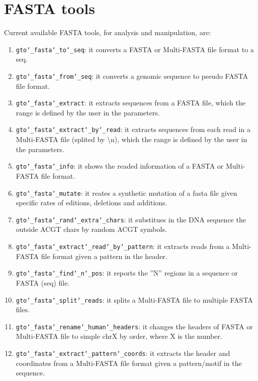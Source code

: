 \chapter{FASTA tools}
\label{fasta}

Current available FASTA tools, for analysis and manipulation, are:
\begin{enumerate}

\item \texttt{gto\char`_fasta\char`_to\char`_seq}: it converts a FASTA or Multi-FASTA file format to a seq.

\item \texttt{gto\char`_fasta\char`_from\char`_seq}: it converts a genomic sequence to pseudo FASTA file format.

\item \texttt{gto\char`_fasta\char`_extract}: it extracts sequences from a FASTA file, which the range is defined by the user in the parameters.

\item \texttt{gto\char`_fasta\char`_extract\char`_by\char`_read}: it extracts sequences from each read in a Multi-FASTA file (splited by \textbackslash n), which the range is defined by the user in the parameters.

\item \texttt{gto\char`_fasta\char`_info}: it shows the readed information of a FASTA or Multi-FASTA file format.

\item \texttt{gto\char`_fasta\char`_mutate}: it reates a synthetic mutation of a fasta file given specific rates of editions, deletions and additions.

\item \texttt{gto\char`_fasta\char`_rand\char`_extra\char`_chars}: it substitues in the DNA sequence the outside ACGT chars by random ACGT symbols.

\item \texttt{gto\char`_fasta\char`_extract\char`_read\char`_by\char`_pattern}: it extracts reads from a Multi-FASTA file format given a pattern in the header.

\item \texttt{gto\char`_fasta\char`_find\char`_n\char`_pos}: it reports the ''N'' regions in a sequence or FASTA (seq) file.

\item \texttt{gto\char`_fasta\char`_split\char`_reads}: it splits a Multi-FASTA file to multiple FASTA files.

\item \texttt{gto\char`_fasta\char`_rename\char`_human\char`_headers}: it changes the headers of FASTA or Multi-FASTA file to simple chrX by order, where X is the number.

\item \texttt{gto\char`_fasta\char`_extract\char`_pattern\char`_coords}: it extracts the header and coordinates from a Multi-FASTA file format given a pattern/motif in the sequence.

\end{enumerate}

